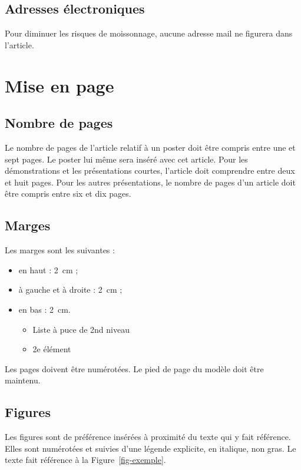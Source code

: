 \documentclass[city=Montpellier,year=2013]{jres}
\begin{document}
\subsection{Adresses électroniques}

Pour diminuer les risques de moissonnage, aucune adresse mail ne
figurera dans l'article.

\section{Mise en page}

\subsection{Nombre de pages}

Le nombre de pages de l'article relatif à un poster doit être compris
entre une et sept pages. Le poster lui même sera inséré avec cet
article. Pour les démonstrations et les présentations courtes,
l'article doit comprendre entre deux et huit pages. Pour les autres
présentations, le nombre de pages d'un article doit être compris entre
six et dix pages.

\subsection{Marges}

Les marges sont les suivantes :

\begin{itemize}
\item en haut : 2\ cm ;
\item à gauche et à droite : 2\ cm ;
\item en bas : 2\ cm.
\begin{itemize}
\item Liste à puce de 2nd niveau
\item 2e élément
\end{itemize}
\end{itemize}

Les pages doivent être numérotées. Le pied de page du modèle doit être
maintenu.

\subsection{Figures}

Les figures sont de préférence insérées à proximité du texte qui y
fait référence. Elles sont numérotées et suivies d'une légende
explicite, en italique, non gras. Le texte fait référence à la
Figure~\ref{fig-exemple}.
\end{document}
